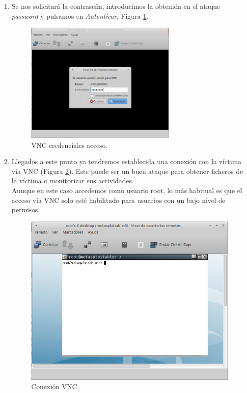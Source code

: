 \documentclass[a4,12pt,onecolum]{article}
\begin{document}
\begin{enumerate}
	\item Se nos solicitará la contraseña, introducimos la obtenida en el ataque \emph{password} y pulsamos en \emph{Autenticar}. Figura \ref{fig:vnc3}.

\begin{figure}[htbp]
\centering
\includegraphics[width=0.7\textwidth]{./images/vnc/credenciales_acceso.png}
\caption{VNC credenciales acceso.}
\label{fig:vnc3}
\end{figure}

	\item Llegados a este punto ya tendremos establecida una conexión con la víctima vía VNC (Figura \ref{fig:vnc4}). Este puede ser un buen ataque para obtener ficheros de la víctima o monitorizar sus actividades. \\

  Aunque en este caso accedemos como usuario root, lo más habitual es que el acceso vía VNC solo esté habilitado para usuarios con un bajo nivel de permisos.

\begin{figure}[htbp]
\centering
\includegraphics[width=1\textwidth]{./images/vnc/vnc_conectado.png}
\caption{Conexión VNC.}
\label{fig:vnc4}
\end{figure}

\end{enumerate}
\end{document}
